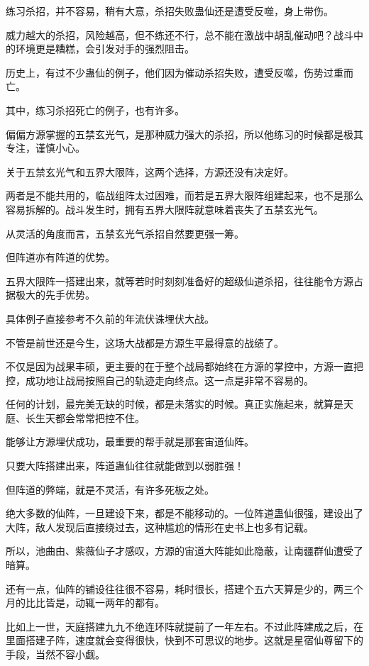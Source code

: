 
\begin{this_body}

练习杀招，并不容易，稍有大意，杀招失败蛊仙还是遭受反噬，身上带伤。

威力越大的杀招，风险越高，但不练还不行，总不能在激战中胡乱催动吧？战斗中的环境更是糟糕，会引发对手的强烈阻击。

历史上，有过不少蛊仙的例子，他们因为催动杀招失败，遭受反噬，伤势过重而亡。

其中，练习杀招死亡的例子，也有许多。

偏偏方源掌握的五禁玄光气，是那种威力强大的杀招，所以他练习的时候都是极其专注，谨慎小心。

关于五禁玄光气和五界大限阵，这两个选择，方源还没有决定好。

两者是不能共用的，临战组阵太过困难，而若是五界大限阵组建起来，也不是那么容易拆解的。战斗发生时，拥有五界大限阵就意味着丧失了五禁玄光气。

从灵活的角度而言，五禁玄光气杀招自然要更强一筹。

但阵道亦有阵道的优势。

五界大限阵一搭建出来，就等若时时刻刻准备好的超级仙道杀招，往往能令方源占据极大的先手优势。

具体例子直接参考不久前的年流伏诛埋伏大战。

不管是前世还是今生，这场大战都是方源生平最得意的战绩了。

不仅是因为战果丰硕，更主要的在于整个战局都始终在方源的掌控中，方源一直把控，成功地让战局按照自己的轨迹走向终点。这一点是非常不容易的。

任何的计划，最完美无缺的时候，都是未落实的时候。真正实施起来，就算是天庭、长生天都会常常把控不住。

能够让方源埋伏成功，最重要的帮手就是那套宙道仙阵。

只要大阵搭建出来，阵道蛊仙往往就能做到以弱胜强！

但阵道的弊端，就是不灵活，有许多死板之处。

绝大多数的仙阵，一旦建设下来，都是不能移动的。一位阵道蛊仙很强，建设出了大阵，敌人发现后直接绕过去，这种尴尬的情形在史书上也多有记载。

所以，池曲由、紫薇仙子才感叹，方源的宙道大阵能如此隐蔽，让南疆群仙遭受了暗算。

还有一点，仙阵的铺设往往很不容易，耗时很长，搭建个五六天算是少的，两三个月的比比皆是，动辄一两年的都有。

比如上一世，天庭搭建九九不绝连环阵就提前了一年左右。不过此阵建成之后，在里面搭建子阵，速度就会变得很快，快到不可思议的地步。这就是星宿仙尊留下的手段，当然不容小觑。


\end{this_body}
